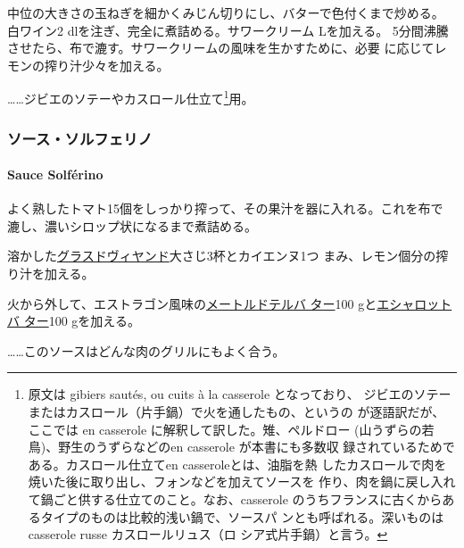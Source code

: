 \begin{recette}
中位の大きさの玉ねぎを細かくみじん切りにし、バターで色付くまで炒める。
白ワイン2 dlを注ぎ、完全に煮詰める。サワークリーム\undemi{} Lを加える。
5分間沸騰させたら、布で漉す。サワークリームの風味を生かすために、必要
に応じてレモンの搾り汁少々を加える。

\ldots{}\ldots{}ジビエのソテーやカスロール仕立て\footnote{原文は gibiers
  sautés, ou cuits à la casserole となっており、
  ジビエのソテーまたはカスロール（片手鍋）で火を通したもの、というの
  が逐語訳だが、ここでは en casserole に解釈して訳した。雉、ペルドロー
  (山うずらの若鳥)、野生のうずらなどのen casserole が本書にも多数収
  録されているためである。カスロール仕立てen casseroleとは、油脂を熱
  したカスロールで肉を焼いた後に取り出し、フォンなどを加えてソースを
  作り、肉を鍋に戻し入れて鍋ごと供する仕立てのこと。なお、casserole
  のうちフランスに古くからあるタイプのものは比較的浅い鍋で、ソースパ
  ンとも呼ばれる。深いものはcasserole russe カスロールリュス（ロ
  シア式片手鍋）と言う。}用。

\maeaki

\hypertarget{ux30bdux30fcux30b9ux30bdux30ebux30d5ux30a7ux30eaux30ce}{%
\subsubsection{ソース・ソルフェリノ}\label{ux30bdux30fcux30b9ux30bdux30ebux30d5ux30a7ux30eaux30ce}}

\hypertarget{sauce-solfuxe9rino}{%
\paragraph{Sauce Solférino}\label{sauce-solfuxe9rino}}


よく熟したトマト15個をしっかり搾って、その果汁を器に入れる。これを布で
漉し、濃いシロップ状になるまで煮詰める。

溶かした\protect\hyperlink{glace-de-viande}{グラスドヴィヤンド}大さじ3杯とカイエンヌ1つ
まみ、レモン\undemi{}個分の搾り汁を加える。

火から外して、エストラゴン風味の\protect\hyperlink{beurre-maitre-d-hotel}{メートルドテルバ
ター}100 gと\protect\hyperlink{beurre-d-echalote}{エシャロットバ
ター}100 gを加える。

\ldots{}\ldots{}このソースはどんな肉のグリルにもよく合う。


\end{recette}
